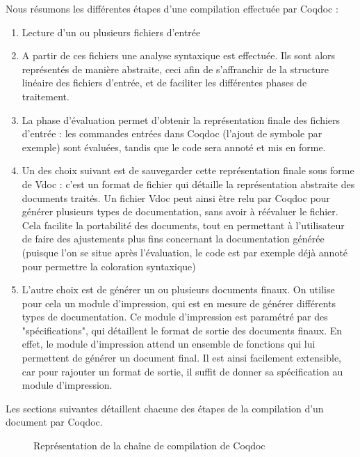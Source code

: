 \documentclass[a4paper, 11pt]{report}
\begin{document}
    Nous résumons les différentes étapes d'une compilation effectuée par
    Coqdoc :
    \begin{enumerate}
      \item Lecture d'un ou plusieurs fichiers d'entrée
      \item A partir de ces fichiers une analyse syntaxique est effectuée.
        Ils sont alors représentés de manière abstraite, ceci afin de
        s'affranchir de la structure linéaire des fichiers d'entrée, et de
        faciliter les différentes phases de traitement.
      \item La phase d'évaluation permet d'obtenir la représentation finale
        des fichiers d'entrée : les commandes entrées dans Coqdoc (l'ajout
        de symbole par exemple) sont évaluées, tandis que le code sera annoté
        et mis en forme.
      \item Un des choix suivant est de sauvegarder cette représentation
        finale sous forme de Vdoc : c'est un format de fichier qui détaille
        la représentation abstraite des documents traités.
        Un fichier Vdoc peut ainsi être relu par Coqdoc pour générer plusieurs
        types de documentation, sans avoir à réévaluer le fichier. Cela facilite
        la portabilité des documents, tout en permettant à l'utilisateur de faire
        des ajustements plus fins concernant la documentation générée (puisque
        l'on se situe après l'évaluation, le code est par exemple déjà annoté
        pour permettre la coloration syntaxique)
      \item L'autre choix est de générer un ou plusieurs documents finaux.
        On utilise pour cela un module d'impression, qui est en mesure de
        générer différents types de documentation.
        Ce module d'impression est paramétré par des "spécifications", qui
        détaillent le format de sortie des documents finaux. En effet, le
        module d'impression attend un ensemble de fonctions qui lui
        permettent de générer un document final.
        Il est ainsi facilement extensible, car pour rajouter un format de
        sortie, il suffit de donner sa spécification au module d'impression.
    \end{enumerate}

    Les sections suivantes détaillent chacune des étapes de la compilation
    d'un document par Coqdoc.
    \begin{figure}
      \caption{Représentation de la chaîne de compilation de Coqdoc}
      \label{fig.devchain}
    \end{figure}
    \clearpage
\end{document}
